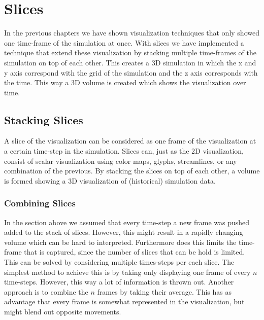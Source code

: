 \chapter{Slices} %
\label{cha:slices}
In the previous chapters we have shown visualization techniques that only showed one time-frame of the simulation at once. With slices we have implemented a technique that extend these visualization by stacking multiple time-frames of the simulation on top of each other. This creates a 3D simulation in which the x and y axis correspond with the grid of the simulation and the z axis corresponds with the time. This way a 3D volume is created which shows the visualization over time. 

\section{Stacking Slices} %
\label{sec:stacking_slices}
A slice of the visualization can be considered as one frame of the visualization at a certain time-step in the simulation. Slices can, just as the 2D visualization, consist of scalar visualization using color maps, glyphs, streamlines, or any combination of the previous. By stacking the slices on top of each other, a volume is formed showing a 3D visualization of (historical) simulation data. 

\subsection{Combining Slices} %
\label{sub:combining_slices}
In the section above we assumed that every time-step a new frame was pushed added to the stack of slices. However, this might result in a rapidly changing volume which can be hard to interpreted. Furthermore does this limits the time-frame that is captured, since the number of slices that can be hold is limited. This can be solved by  considering multiple times-steps per each slice. The simplest method to achieve this is by taking only displaying one frame of every $n$ time-steps. However, this way a lot of information is thrown out. Another approach is to combine the $n$ frames by taking their average. This has as advantage that every frame is somewhat represented in the visualization, but might blend out opposite movements. 


